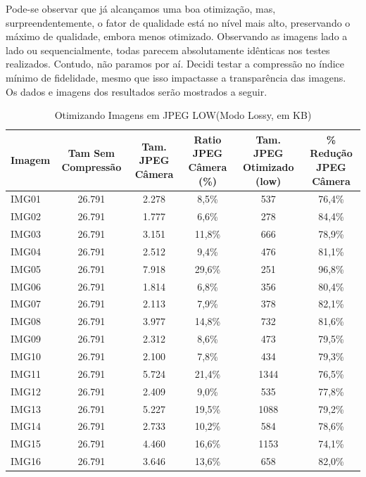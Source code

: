 \paragrafo Pode-se observar que já alcançamos uma boa otimização, mas, surpreendentemente, o fator de qualidade está no nível mais alto, preservando o máximo de qualidade, embora menos otimizado. Observando as imagens lado a lado ou sequencialmente, todas parecem absolutamente idênticas nos testes realizados. Contudo, não paramos por aí. Decidi testar a compressão no índice mínimo de fidelidade, mesmo que isso impactasse a transparência das imagens. Os dados e imagens dos resultados serão mostrados a seguir.

\begin{table}[H]
    \centering
    \caption{Otimizando Imagens em JPEG LOW(Modo Lossy, em KB)}
    \label{tab:6b}

    \footnotesize
    \begin{tabularx}{\textwidth}{X|C|C|C|C|C}
    \hline
        Imagem & Tam Sem Compressão & Tam. JPEG Câmera & Ratio JPEG Câmera (\%) & Tam. JPEG Otimizado (low)\textbf{} & \% Redução JPEG Câmera \\ \hline 
        IMG01 & 26.791 & 2.278 & 8,5\% & 537 & 76,4\% \\ 
        IMG02 & 26.791 & 1.777 & 6,6\% & 278 & 84,4\% \\ 
        IMG03 & 26.791 & 3.151 & 11,8\% & 666 & 78,9\% \\ 
        IMG04 & 26.791 & 2.512 & 9,4\% & 476 & 81,1\% \\ 
        IMG05 & 26.791 & 7.918 & 29,6\% & 251 & 96,8\% \\ 
        IMG06 & 26.791 & 1.814 & 6,8\% & 356 & 80,4\% \\ 
        IMG07 & 26.791 & 2.113 & 7,9\% & 378 & 82,1\% \\ 
        IMG08 & 26.791 & 3.977 & 14,8\% & 732 & 81,6\% \\ 
        IMG09 & 26.791 & 2.312 & 8,6\% & 473 & 79,5\% \\ 
        IMG10 & 26.791 & 2.100 & 7,8\% & 434 & 79,3\% \\ 
        IMG11 & 26.791 & 5.724 & 21,4\% & 1344 & 76,5\% \\ 
        IMG12 & 26.791 & 2.409 & 9,0\% & 535 & 77,8\% \\ 
        IMG13 & 26.791 & 5.227 & 19,5\% & 1088 & 79,2\% \\ 
        IMG14 & 26.791 & 2.733 & 10,2\% & 584 & 78,6\% \\ 
        IMG15 & 26.791 & 4.460 & 16,6\% & 1153 & 74,1\% \\ 
        IMG16 & 26.791 & 3.646 & 13,6\% & 658 & 82,0\% \\ 

\end{tabularx}
\end{table}
